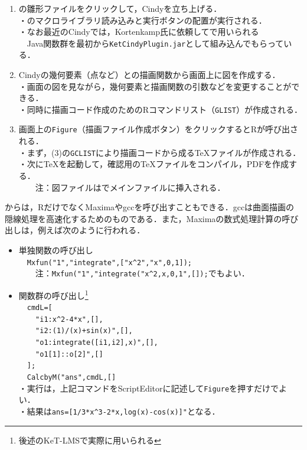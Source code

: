 \documentclass[a4j,12pt]{ujarticle}
\begin{document}
\begin{enumerate}
\item \ketcindy の雛形ファイルをクリックして，Cindyを立ち上げる．\\
・\ketcindy のマクロライブラリ読み込みと実行ボタンの配置が実行される．\\
・なお最近のCindyでは，Kortenkamp氏に依頼して\ketcindy で用いられる\\
　Java関数群を最初から\verb|KetCindyPlugin.jar|として組み込んでもらっている．\vspace{-2mm}
\item Cindyの幾何要素（点など）と\ketcindy の描画関数から画面上に図を作成する．\\
・画面の図を見ながら，幾何要素と描画関数の引数などを変更することができる．\\
・同時に描画コード作成のためのRコマンドリスト（\verb|GLIST|）が作成される．

\vspace{-2mm}
\item 画面上の\verb|Figure|（描画ファイル作成ボタン）をクリックするとRが呼び出される．\\
・まず，(3)の\verb|GCLIST|により描画コードから成る\TeX ファイルが作成される．\\
・次に\TeX を起動して，確認用の\TeX ファイルをコンパイル，PDFを作成する．\\
　　注：図ファイルは\verb||でメインファイルに挿入される．\vspace{-1mm}
\end{enumerate}

\ketcindy からは，RだけでなくMaximaやgccを呼び出すこともできる．gccは\ketcindy 曲面描画の隠線処理を高速化するためのものである．また，Maximaの数式処理計算の呼び出しは，例えば次のように行われる．\vspace{-1mm}

\begin{itemize}
\item 単独関数の呼び出し\\
　\verb|Mxfun("1","integrate",["x^2","x",0,1]);|\\
　　注：\verb|Mxfun("1","integrate("x^2,x,0,1",[]);|でもよい．\vspace{-2mm}
\item 関数群の呼び出し\footnote{後述のKeT-LMSで実際に用いられる}\\
　\verb|cmdL=[|\\
　\verb|  "i1:x^2-4*x",[],|\\
　\verb|  "i2:(1)/(x)+sin(x)",[],|\\
　\verb|  "o1:integrate([i1,i2],x)",[],|\\
　\verb|  "o1[1]::o[2]",[]|\\
　\verb|];|\\
　\verb|CalcbyM("ans",cmdL,[]|\\
・実行は，上記コマンドをScriptEditorに記述して\verb|Figure|を押すだけでよい．\\
・結果は\verb|ans=[1/3*x^3-2*x,log(x)-cos(x)]"|となる．\vspace{-1mm}
\end{itemize}
\end{document}
